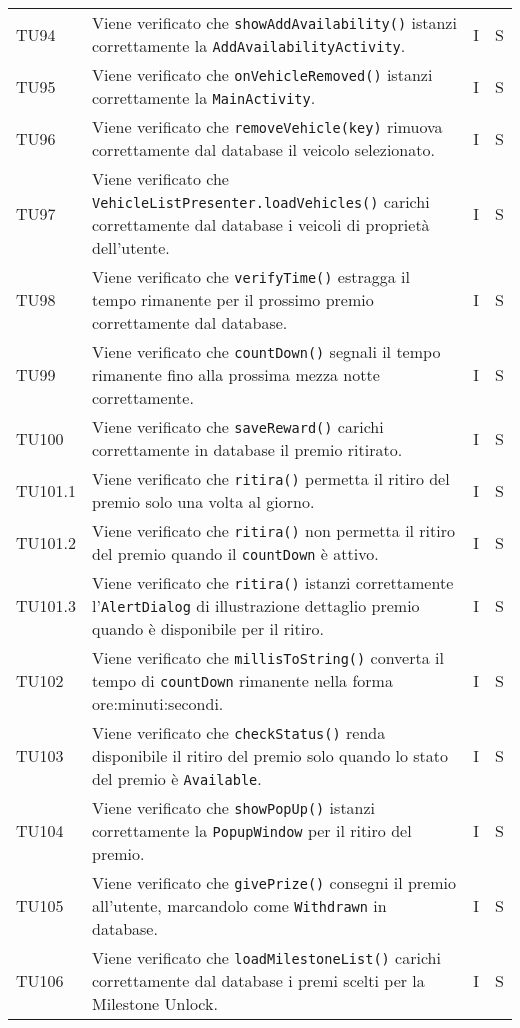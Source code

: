 \begin{longtable}{ >{\centering}p{}  >{\centering}p{} >{\centering}p{}
			>{\centering}p{}}
		TU94 & Viene verificato che \texttt{showAddAvailability()} istanzi correttamente la \texttt{AddAvailabilityActivity}. & I & S
		\tabularnewline	
		TU95 & Viene verificato che \texttt{onVehicleRemoved()} istanzi correttamente la \texttt{MainActivity}. & I & S
		\tabularnewline	
		TU96 & Viene verificato che \texttt{removeVehicle(key)} rimuova correttamente dal database il veicolo selezionato. & I & S
		\tabularnewline	
		TU97 & Viene verificato che \texttt{VehicleListPresenter.loadVehicles()} carichi correttamente dal database i veicoli di proprietà dell'utente. & I & S
		\tabularnewline	
		TU98 & Viene verificato che \texttt{verifyTime()} estragga il tempo rimanente per il prossimo premio correttamente dal database. & I & S
		\tabularnewline	
		TU99 & Viene verificato che \texttt{countDown()} segnali il tempo rimanente fino alla prossima mezza notte correttamente. & I & S
		\tabularnewline	
		TU100 & Viene verificato che \texttt{saveReward()} carichi correttamente in database il premio ritirato. & I & S
		\tabularnewline	
		TU101.1 & Viene verificato che \texttt{ritira()} permetta il ritiro del premio solo una volta al giorno. & I & S
		\tabularnewline	
		TU101.2 & Viene verificato che \texttt{ritira()} non permetta il ritiro del premio quando il \texttt{countDown} è attivo. & I & S
		\tabularnewline	
		TU101.3 & Viene verificato che \texttt{ritira()} istanzi correttamente l'\texttt{AlertDialog} di illustrazione dettaglio premio quando è disponibile per il ritiro. & I & S
		\tabularnewline
		
		TU102 & Viene verificato che \texttt{millisToString()} converta il tempo di \texttt{countDown} rimanente nella forma ore:minuti:secondi. & I & S
		\tabularnewline	
		TU103 & Viene verificato che \texttt{checkStatus()} renda disponibile il ritiro del premio solo quando lo stato del premio è \texttt{Available}. & I & S
		\tabularnewline	
		TU104 & Viene verificato che \texttt{showPopUp()} istanzi correttamente la \texttt{PopupWindow} per il ritiro del premio. & I & S
		\tabularnewline	
		TU105 & Viene verificato che \texttt{givePrize()} consegni il premio all'utente, marcandolo come \texttt{Withdrawn} in database. & I & S
		\tabularnewline	
		TU106 & Viene verificato che \texttt{loadMilestoneList()} carichi correttamente dal database i premi scelti per la Milestone Unlock. & I & S
		
		
		\end{longtable}
